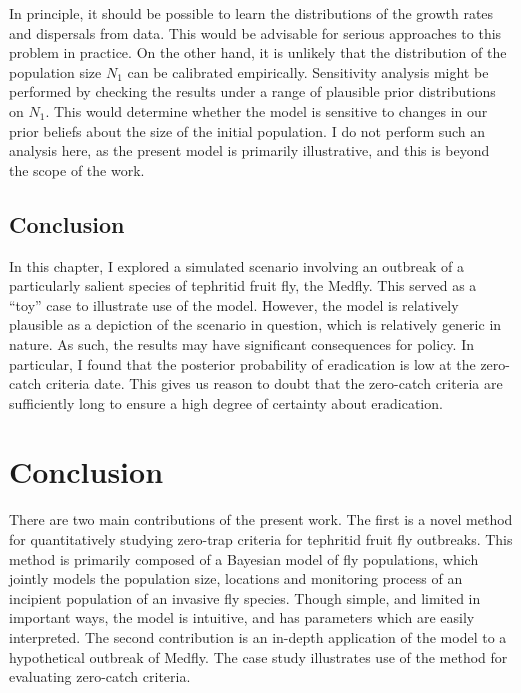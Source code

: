 \documentclass[
  oneside]{book}
\begin{document}
In principle, it should be possible to learn the distributions of the growth rates and dispersals from data. This would be advisable for serious approaches to this problem in practice. On the other hand, it is unlikely that the distribution of the population size \(N_1\) can be calibrated empirically. Sensitivity analysis might be performed by checking the results under a range of plausible prior distributions on \(N_1\). This would determine whether the model is sensitive to changes in our prior beliefs about the size of the initial population. I do not perform such an analysis here, as the present model is primarily illustrative, and this is beyond the scope of the work.

\hypertarget{conclusion-2}{%
\section{Conclusion}\label{conclusion-2}}

In this chapter, I explored a simulated scenario involving an outbreak of a particularly salient species of tephritid fruit fly, the Medfly. This served as a ``toy'' case to illustrate use of the model. However, the model is relatively plausible as a depiction of the scenario in question, which is relatively generic in nature. As such, the results may have significant consequences for policy. In particular, I found that the posterior probability of eradication is low at the zero-catch criteria date. This gives us reason to doubt that the zero-catch criteria are sufficiently long to ensure a high degree of certainty about eradication.

\hypertarget{conclusion-3}{%
\chapter{Conclusion}\label{conclusion-3}}

There are two main contributions of the present work. The first is a novel method for quantitatively studying zero-trap criteria for tephritid fruit fly outbreaks. This method is primarily composed of a Bayesian model of fly populations, which jointly models the population size, locations and monitoring process of an incipient population of an invasive fly species. Though simple, and limited in important ways, the model is intuitive, and has parameters which are easily interpreted. The second contribution is an in-depth application of the model to a hypothetical outbreak of Medfly. The case study illustrates use of the method for evaluating zero-catch criteria.
\end{document}
